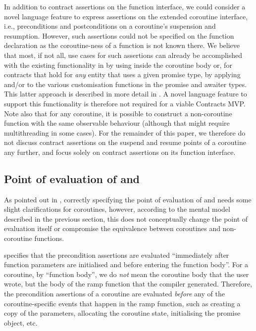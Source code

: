 In addition to contract assertions on the function interface, we could consider a novel language feature to express assertions on the extended coroutine interface, i.e., preconditions and postconditions on a coroutine's suspension and resumption. However, such assertions could not be specified on the function declaration as the coroutine-ness of a function is not known there. We believe that most, if not all, use cases for such assertions can already be accomplished with the existing functionality in \cite{P2900R8} by using  inside the coroutine body or, for contracts that hold for \emph{any} entity that uses a given promise type, by applying  and/or  to the various customisation functions in the promise and awaiter types. This latter approach is described in more detail in \cite{P3251R0}. A novel language feature to support this functionality is therefore not required for a viable Contracts MVP. Note also that for any coroutine, it is possible to construct a non-coroutine function with the same observable behaviour (although that might require multithreading in some cases). For the remainder of this paper, we therefore do not discuss contract assertions on the suspend and resume points of a coroutine any further, and focus solely on contract assertions on its function interface.

\subsection{Point of evaluation of  and }

As pointed out in \cite{P2957R1}, correctly specifying the point of evaluation of  and  needs some slight clarifications for coroutines, however, according to the mental model described in the previous section, this does not conceptually change the point of evaluation itself or compromise the equivalence between coroutines and non-coroutine functions.

\cite{P2900R8} specifies that the precondition assertions are evaluated ``immediately after function parameters are initialised and before entering the function body''. For a coroutine, by ``function body'', we do \emph{not} mean the coroutine body that the user wrote, but the body of the ramp function that the compiler generated. Therefore, the precondition assertions of a coroutine are evaluated \emph{before} any of the coroutine-specific events that happen in the ramp function, such as creating a copy of the parameters, allocating the coroutine state, initialising the promise object, etc.

